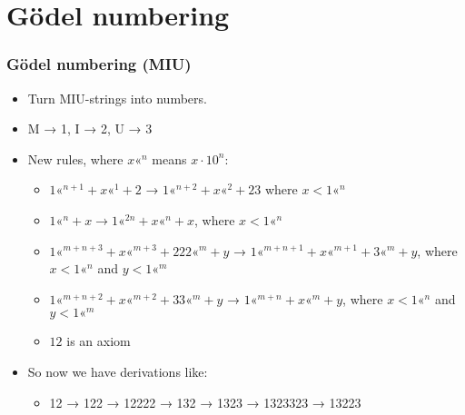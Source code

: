 \documentclass[mathserif]{beamer}
\newcommand{\shl}[1]{\text{«}^{#1}}
\begin{document}
\section{Gödel numbering}
\label{sec-3}
\begin{frame}
\frametitle{Gödel numbering (MIU)}
\label{sec-3-1}

\pause
\begin{itemize}

\item Turn MIU-strings into numbers.\pause\\
\label{sec-3-1-1}%
\item M → 1, I → 2, U → 3\pause\\
\label{sec-3-1-2}%
\item New rules, where $x\shl{n}$ means $x\cdot 10^n$:\pause
\label{sec-3-1-3}%
\begin{itemize}

\item $1\shl{n+1} + x\shl{1} + 2$ → $1\shl{n+2} + x\shl{2} + 23$ where $x < 1\shl{n}$ \pause\\
\label{sec-3-1-3-1}%
\item $1\shl{n} + x → 1\shl{2n} + x\shl{n} + x$, where $x < 1\shl{n}$ \pause\\
\label{sec-3-1-3-2}%
\item $1\shl{m+n+3} + x\shl{m+3} + 222\shl{m} + y$ → $1\shl{m+n+1} + x\shl{m+1} + 3\shl{m} + y$, where $x < 1\shl{n}$ and $y < 1\shl{m}$ \pause\\
\label{sec-3-1-3-3}%
\item $1\shl{m+n+2} + x\shl{m+2} + 33\shl{m} + y$ → $1\shl{m+n} + x\shl{m} + y$, where $x < 1\shl{n}$ and $y < 1\shl{m}$ \pause\\
\label{sec-3-1-3-4}%
\item $12$ is an axiom\pause\\
\label{sec-3-1-3-5}%
\end{itemize} %

\item So now we have derivations like:\pause
\label{sec-3-1-4}%
\begin{itemize}

\item 12 → 122 → 12222 → 132 → 1323 → 1323323 → 13223\\
\label{sec-3-1-4-1}%
\end{itemize} %
\end{itemize} %
\end{frame}
\end{document}
